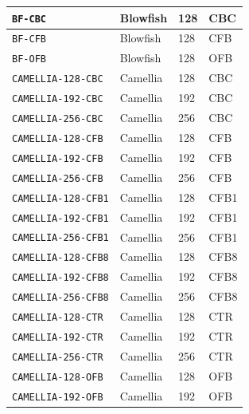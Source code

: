 \documentclass[synpaper]{book}
\begin{document}
\begin{table}[H]
\begin{small}
\begin{tabular}{|l|l|l|l|}
\hline \texttt{BF-CBC}            & Blowfish        & 128                       & CBC    \\
\hline \texttt{BF-CFB}            & Blowfish        & 128                       & CFB    \\
\hline \texttt{BF-OFB}            & Blowfish        & 128                       & OFB    \\
\hline \texttt{CAMELLIA-128-CBC}  & Camellia        & 128                       & CBC    \\
\hline \texttt{CAMELLIA-192-CBC}  & Camellia        & 192                       & CBC    \\
\hline \texttt{CAMELLIA-256-CBC}  & Camellia        & 256                       & CBC    \\
\hline \texttt{CAMELLIA-128-CFB}  & Camellia        & 128                       & CFB    \\
\hline \texttt{CAMELLIA-192-CFB}  & Camellia        & 192                       & CFB    \\
\hline \texttt{CAMELLIA-256-CFB}  & Camellia        & 256                       & CFB    \\
\hline \texttt{CAMELLIA-128-CFB1} & Camellia        & 128                       & CFB1   \\
\hline \texttt{CAMELLIA-192-CFB1} & Camellia        & 192                       & CFB1   \\
\hline \texttt{CAMELLIA-256-CFB1} & Camellia        & 256                       & CFB1   \\
\hline \texttt{CAMELLIA-128-CFB8} & Camellia        & 128                       & CFB8   \\
\hline \texttt{CAMELLIA-192-CFB8} & Camellia        & 192                       & CFB8   \\
\hline \texttt{CAMELLIA-256-CFB8} & Camellia        & 256                       & CFB8   \\
\hline \texttt{CAMELLIA-128-CTR}  & Camellia        & 128                       & CTR    \\
\hline \texttt{CAMELLIA-192-CTR}  & Camellia        & 192                       & CTR    \\
\hline \texttt{CAMELLIA-256-CTR}  & Camellia        & 256                       & CTR    \\
\hline \texttt{CAMELLIA-128-OFB}  & Camellia        & 128                       & OFB    \\
\hline \texttt{CAMELLIA-192-OFB}  & Camellia        & 192                       & OFB    \\

\end{tabular}
\end{small}
\end{table}
\end{document}
